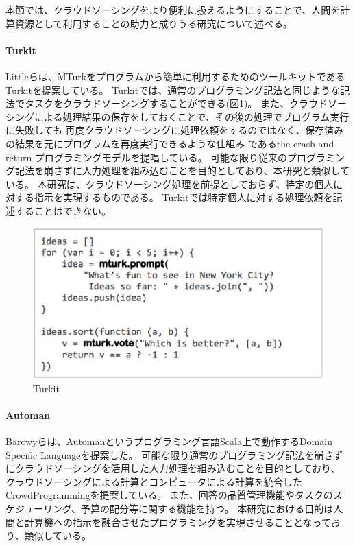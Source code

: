 本節では、クラウドソーシングをより便利に扱えるようにすることで、人間を計算資源として利用することの助力と成りうる研究について述べる。

\paragraph{Turkit}\label{turkit}

\mbox{}

Littleらは、MTurkをプログラムから簡単に利用するためのツールキットであるTurkit\cite{turkit}を提案している。
Turkitでは、通常のプログラミング記法と同じような記法でタスクをクラウドソーシングすることができる(図\ref{fig:turkit})。
また、クラウドソーシングによる処理結果の保存をしておくことで、その後の処理でプログラム実行に失敗しても
再度クラウドソーシングに処理依頼をするのではなく、保存済みの結果を元にプログラムを再度実行できるような仕組み
であるthe crash-and-return プログラミングモデルを提唱している。
可能な限り従来のプログラミング記法を崩さずに人力処理を組み込むことを目的としており、本研究と類似している。
本研究は、クラウドソーシング処理を前提としておらず、特定の個人に対する指示を実現するものである。
Turkitでは特定個人に対する処理依頼を記述することはできない。

\begin{figure}[htbp]
  \begin{center}
  \includegraphics[width=.6\linewidth]{images/turkit.eps}
  \end{center}
  \caption{Turkit}
  \label{fig:turkit}
\end{figure}

\paragraph{Automan}\label{automan}

\mbox{}

Barowyらは、Automanというプログラミング言語Scala上で動作するDomain
Specific Languageを提案した\cite{automan}。
可能な限り通常のプログラミング記法を崩さずにクラウドソーシングを活用した人力処理を組み込むことを目的としており、
クラウドソーシングによる計算とコンピュータによる計算を統合したCrowdProgrammingを提案している。
また、回答の品質管理機能やタスクのスケジューリング、予算の配分等に関する機能を持つ。
本研究における目的は人間と計算機への指示を融合させたプログラミングを実現させることとなっており、類似している。

